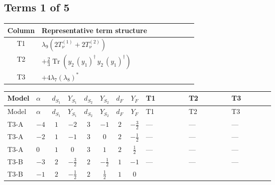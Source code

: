 \documentclass[8pt]{article}
\begin{document}
\begin{landscape}
\subsection*{Terms 1 of 5}
\begin{center}
\begin{tabular}{@{}c >{\raggedright\arraybackslash}p{0.82\linewidth}@{}}
\toprule
Column & Representative term structure \\
\midrule
T1 & \(\displaystyle {\lambda_{9}} (2 T_{\nu}^{(1)}+2 T_{\nu}^{(2)})\) \\
\midrule
T2 & \(\displaystyle +\frac{2}{3} \operatorname{Tr}\!\left({y_2}\,\left({y_1}\right)^{\dagger}\,{y_2}\,\left({y_1}\right)^{\dagger}\right)\) \\
\midrule
T3 & \(\displaystyle +4 {\lambda_{7}} \left({\lambda_{8}}\right)^{*}\) \\
\midrule
\bottomrule
\end{tabular}
\end{center}
\smallskip
\tiny
\begin{longtable}{@{}llcccccc >{\raggedright\arraybackslash}p{0.21\linewidth} >{\raggedright\arraybackslash}p{0.21\linewidth} >{\raggedright\arraybackslash}p{0.21\linewidth}@{}}
\toprule
Model & $\alpha$ & $d_{S_1}$ & $Y_{S_1}$ & $d_{S_2}$ & $Y_{S_2}$ & $d_F$ & $Y_F$ & T1 & T2 & T3 \\
\midrule
\endfirsthead
\toprule
Model & $\alpha$ & $d_{S_1}$ & $Y_{S_1}$ & $d_{S_2}$ & $Y_{S_2}$ & $d_F$ & $Y_F$ & T1 & T2 & T3 \\
\midrule
\endhead
T3-A & $-4$ & $1$ & $-2$ & $3$ & $-1$ & $2$ & $-\frac{3}{2}$ & --- & --- & --- \\
\midrule
T3-A & $-2$ & $1$ & $-1$ & $3$ & $0$ & $2$ & $-\frac{1}{2}$ & --- & --- & --- \\
\midrule
T3-A & $0$ & $1$ & $0$ & $3$ & $1$ & $2$ & $\frac{1}{2}$ & --- & --- & --- \\
\midrule
T3-B & $-3$ & $2$ & $-\frac{3}{2}$ & $2$ & $-\frac{1}{2}$ & $1$ & $-1$ & --- & --- & --- \\
\midrule
T3-B & $-1$ & $2$ & $-\frac{1}{2}$ & $2$ & $\frac{1}{2}$ & $1$ & $0$ & \scriptsize\adjustbox{max width=\linewidth}{$\begin{gathered} {\lambda_{9}} (2 T_{\nu}^{(1)}+2 T_{\nu}^{(2)})\end{gathered}$} & \scriptsize\adjustbox{max width=\linewidth}{$\begin{gathered} +\frac{2}{3} \operatorname{Tr}\!\left({y_2}\,\left({y_1}\right)^{\dagger}\,{y_2}\,\left({y_1}\right)^{\dagger}\right)\end{gathered}$} & \scriptsize\adjustbox{max width=\linewidth}{$\begin{gathered} +4 {\lambda_{7}} \left({\lambda_{8}}\right)^{*}\end{gathered}$} \\

\end{longtable}
\end{landscape}
\end{document}
